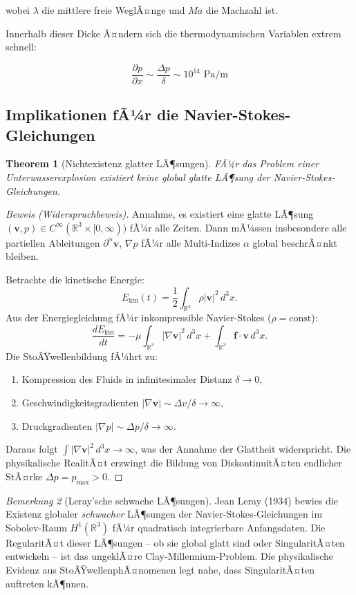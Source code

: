 ﻿\documentclass[12pt,a4paper]{article}
\newtheorem{theorem}{Theorem}[section]
\theoremstyle{definition}
\theoremstyle{remark}
\newtheorem{remark}[theorem]{Bemerkung}
\begin{document}
wobei $\lambda$ die mittlere freie WeglÃ¤nge und $Ma$ die Machzahl ist.

Innerhalb dieser Dicke Ã¤ndern sich die thermodynamischen Variablen extrem schnell:

\begin{equation}
\frac{\partial p}{\partial x} \sim \frac{\Delta p}{\delta} \sim 10^{14} \text{ Pa/m}
\end{equation}

\subsection{Implikationen fÃ¼r die Navier-Stokes-Gleichungen}

\begin{theorem}[Nichtexistenz glatter LÃ¶sungen]
FÃ¼r das Problem einer Unterwasserexplosion existiert keine global glatte LÃ¶sung der Navier-Stokes-Gleichungen.
\end{theorem}

\begin{proof}[Beweis (Widerspruchbeweis)]
Annahme, es existiert eine glatte LÃ¶sung $(\mathbf{v}, p) \in C^\infty(\mathbb{R}^3 \times [0,\infty))$ fÃ¼r alle Zeiten. Dann mÃ¼ssen insbesondere alle partiellen Ableitungen $\partial^\alpha \mathbf{v}$, $\nabla p$ fÃ¼r alle Multi-Indizes $\alpha$ global beschrÃ¤nkt bleiben.

Betrachte die kinetische Energie:
\[
E_{\text{kin}}(t) = \frac{1}{2}\int_{\mathbb{R}^3} \rho |\mathbf{v}|^2\,d^3x.
\]
Aus der Energiegleichung fÃ¼r inkompressible Navier-Stokes ($\rho = \text{const}$):
\[
\frac{dE_{\text{kin}}}{dt} = -\mu\int_{\mathbb{R}^3}|\nabla\mathbf{v}|^2\,d^3x + \int_{\mathbb{R}^3}\mathbf{f}\cdot\mathbf{v}\,d^3x.
\]
Die StoÃŸwellenbildung fÃ¼hrt zu:
\begin{enumerate}
\item Kompression des Fluids in infinitesimaler Distanz $\delta \to 0$,
\item Geschwindigkeitsgradienten $|\nabla\mathbf{v}| \sim \Delta v/\delta \to \infty$,
\item Druckgradienten $|\nabla p| \sim \Delta p/\delta \to \infty$.
\end{enumerate}
Daraus folgt $\int |\nabla\mathbf{v}|^2\,d^3x \to \infty$, was der Annahme der Glattheit widerspricht. Die physikalische RealitÃ¤t erzwingt die Bildung von DiskontinuitÃ¤ten endlicher StÃ¤rke $\Delta p = p_{\text{max}} > 0$. 
\end{proof}

\begin{remark}[Leray'sche schwache LÃ¶sungen]
Jean Leray (1934) bewies die Existenz globaler \emph{schwacher} LÃ¶sungen der Navier-Stokes-Gleichungen im Sobolev-Raum $H^1(\mathbb{R}^3)$ fÃ¼r quadratisch integrierbare Anfangsdaten. Die RegularitÃ¤t dieser LÃ¶sungen -- ob sie global glatt sind oder SingularitÃ¤ten entwickeln -- ist das ungeklÃ¤re Clay-Millennium-Problem. Die physikalische Evidenz aus StoÃŸwellenphÃ¤nomenen legt nahe, dass SingularitÃ¤ten auftreten kÃ¶nnen.
\end{remark}
\end{document}
